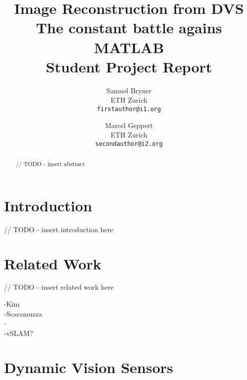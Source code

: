 \documentclass[10pt,twocolumn,letterpaper]{article}
\begin{document}
\title{Image Reconstruction from DVS\\ The constant battle agains MATLAB\\ Student Project Report}

\author{Samuel Bryner\\
ETH Zurich\\
{\tt\small firstauthor@i1.org}
\and
Marcel Geppert\\
ETH Zurich\\
{\tt\small secondauthor@i2.org}
}

\maketitle

\begin{abstract}

// TODO - insert abstract

\end{abstract}

\section{Introduction}

// TODO - insert introduction here

\section{Related Work}

// TODO - insert related work here

-Kim \etal\\
-Scaramuzza\\
-\cite{lpd08dvs}\\
-vSLAM?\\

\section{Dynamic Vision Sensors}
\end{document}
